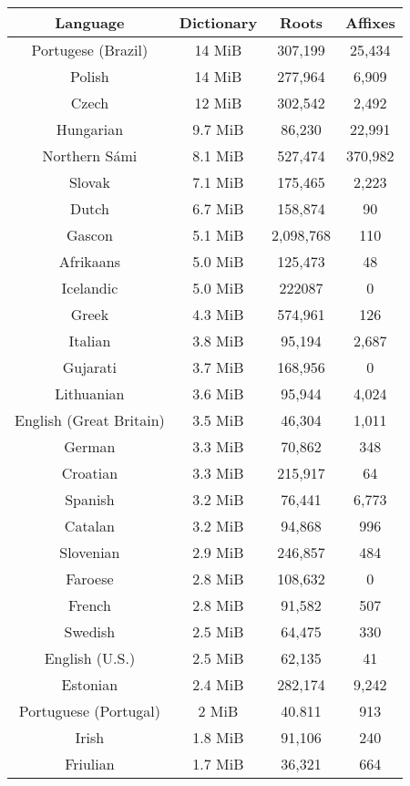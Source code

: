 \documentclass[officiallayout,final]{unihelcompling}
\begin{document}
\begin{longtable}{c|c|c|c}
    \hline
    \textbf{Language} & \textbf{Dictionary} & \textbf{Roots} & \textbf{Affixes} 
\\
    \hline
    \hline
    Portugese (Brazil) & 14 MiB & 307,199 & 25,434 \\
    Polish & 14 MiB & 277,964 & 6,909 \\
    Czech & 12 MiB & 302,542 & 2,492 \\
    Hungarian & 9.7 MiB & 86,230 & 22,991 \\
    Northern S\'{a}mi & 8.1 MiB & 527,474 & 370,982 \\ 
    Slovak & 7.1 MiB & 175,465 & 2,223 \\
    Dutch & 6.7 MiB & 158,874 & 90\\
    Gascon & 5.1 MiB & 2,098,768 & 110 \\
    Afrikaans & 5.0 MiB & 125,473 & 48 \\
    Icelandic & 5.0 MiB & 222087 & 0 \\
    Greek & 4.3 MiB & 574,961 & 126 \\
    Italian & 3.8 MiB & 95,194 & 2,687 \\
    Gujarati & 3.7 MiB & 168,956 & 0 \\
    Lithuanian & 3.6 MiB & 95,944 & 4,024 \\
    English (Great Britain) & 3.5 MiB & 46,304 & 1,011 \\
    German & 3.3 MiB & 70,862 & 348 \\
    Croatian & 3.3 MiB & 215,917 & 64 \\
    Spanish & 3.2 MiB & 76,441 & 6,773 \\
    Catalan & 3.2 MiB & 94,868 & 996 \\
    Slovenian & 2.9 MiB & 246,857 & 484 \\
    Faroese & 2.8 MiB & 108,632 & 0 \\
    French & 2.8 MiB & 91,582 & 507 \\
    Swedish & 2.5 MiB & 64,475 & 330 \\
    English (U.S.) & 2.5 MiB & 62,135 & 41 \\
    Estonian & 2.4 MiB & 282,174 & 9,242\\
    Portuguese (Portugal) & 2 MiB & 40.811 & 913 \\
    Irish & 1.8 MiB & 91,106 & 240 \\
    Friulian & 1.7 MiB & 36,321 & 664 \\

\end{longtable}
\end{document}
